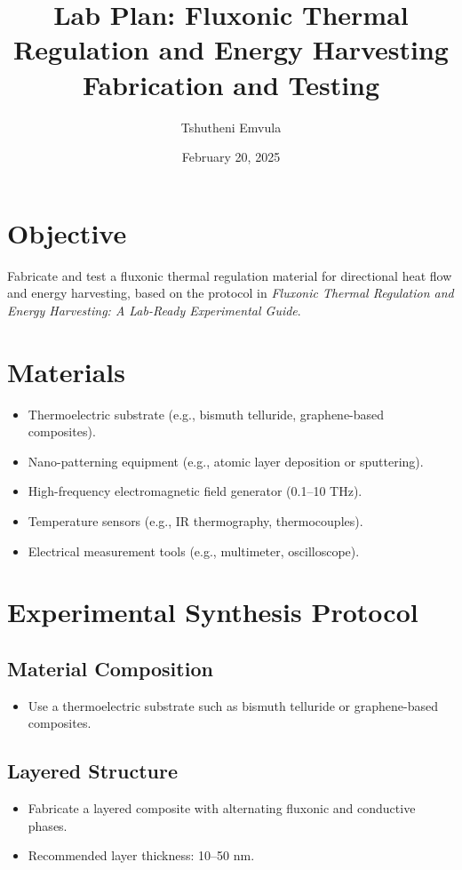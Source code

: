 \documentclass[a4paper,12pt]{article}
\title{Lab Plan: Fluxonic Thermal Regulation and Energy Harvesting Fabrication and Testing}
\author{Tshutheni Emvula}
\date{February 20, 2025}
\begin{document}
\maketitle

\section{Objective}
Fabricate and test a fluxonic thermal regulation material for directional heat flow and energy harvesting, based on the protocol in \emph{Fluxonic Thermal Regulation and Energy Harvesting: A Lab-Ready Experimental Guide}.

\section{Materials}
\begin{itemize}
    \item Thermoelectric substrate (e.g., bismuth telluride, graphene-based composites).
    \item Nano-patterning equipment (e.g., atomic layer deposition or sputtering).
    \item High-frequency electromagnetic field generator (0.1--10 THz).
    \item Temperature sensors (e.g., IR thermography, thermocouples).
    \item Electrical measurement tools (e.g., multimeter, oscilloscope).
\end{itemize}

\section{Experimental Synthesis Protocol}
\subsection{Material Composition}
\begin{itemize}
    \item Use a thermoelectric substrate such as bismuth telluride or graphene-based composites.
\end{itemize}

\subsection{Layered Structure}
\begin{itemize}
    \item Fabricate a layered composite with alternating fluxonic and conductive phases.
    \item Recommended layer thickness: 10--50 nm.
\end{itemize}
\end{document}
